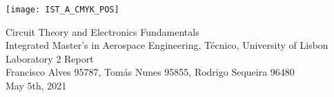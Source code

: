 
\thispagestyle {empty}

\texttt{[image: IST\_A\_CMYK\_POS]}

\begin{center}
%
\vspace{1.0cm}

\vspace{1cm}
{\FontLb Circuit Theory and Electronics Fundamentals} \\ %
\vspace{1cm}
{\FontSn Integrated Master's in Aerospace Engineering, Técnico, University of Lisbon} \\ 
\vspace{1cm}
{\FontSn Laboratory 2 Report} \\ 
\vspace{1cm}
{\FontSn Francisco Alves 95787, Tomás Nunes 95855, Rodrigo Sequeira 96480} \\ 
\vspace{1cm}
{\FontSn May 5th, 2021} 
%
\end{center}

